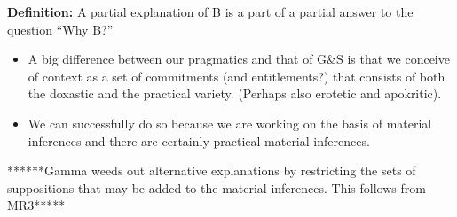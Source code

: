 \documentclass{article}                     %
\makeatletter
\newcommand{\Uuparrow}{%
	\raisebox{.2ex}{\clipbox{0pt .15pt 0pt 0pt}{$\Uparrow$}}
}
\newcommand{\thuarrow}{%
	\raisebox{.05ex}{\clipbox{0pt .8pt 0pt 0pt}{$\twoheaduparrow$}}
}
\newcommand{\nms}{%
	\mathbin{\mathpalette\@nms\expandafter}
}
\newcommand{\@nms}{\mid\joinrel\mkern-.5mu\sim}
\newcommand{\mrc}[1]{\mathbin{
		\mathchoice
		{\normalsize\hspace{.5mm}\nms^{\mkern-19mu\scriptsize\Uuparrow#1}\hspace{-.5mm}}
		{\normalsize\hspace{.5mm}\nms^{\mkern-19mu\scriptsize\Uuparrow#1}\hspace{-.5mm}}
		{\footnotesize\hspace{.5mm}\nms^{\mkern-13.5mu\fontsize{5.5}{0}\Uuparrow#1}}
		{\scriptsize\nms^{\mkern-10mu\tiny\Uuparrow#1}}
	}
}
\newcommand{\smc}{\mathbin{
		\mathchoice
		{\hspace{.4mm}\nms^{\mkern-17mu\scriptsize\thuarrow}\hspace{.6mm}}
		{\hspace{.4mm}\nms^{\mkern-17mu\scriptsize\thuarrow}\hspace{.6mm}}
		{\footnotesize\hspace{.4mm}\nms^{\mkern-11mu\tiny\thuarrow}\hspace{.6mm}}
		{\scriptsize\nms^{\mkern-10mu\tiny\thuarrow}}
	}
}
\makeatother
\begin{document}
\textbf{Definition:} A partial explanation of B is a part of a partial answer to the question ``Why B?''\\

\begin{itemize}
	\item A big difference between our pragmatics and that of G\&S is that we conceive of context as a set of commitments (and entitlements?) that consists of both the doxastic and the practical variety. (Perhaps also erotetic and apokritic).
	\item We can successfully do so because we are working on the basis of material inferences and there are certainly practical material inferences.
\end{itemize}

******Gamma weeds out alternative explanations by restricting the sets of suppositions that may be added to the material inferences. This follows from MR3*****














%



\printbibliography
\end{document}
